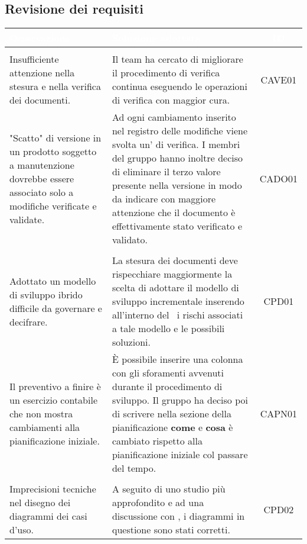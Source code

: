 \subsection{Revisione dei requisiti}
	\begin{longtable}{|C{4cm}|C{9cm}|c|}
		\textcolor{white}{\textbf{Osservazione}}&
		\textcolor{white}{\textbf{Soluzione adottata}}&
		\textcolor{white}{\textbf{ID}}\label{tab:CriticitàRR}\\ \hline
		\\ \hline
		Insufficiente attenzione nella stesura e nella verifica dei documenti. & Il team ha cercato di migliorare il procedimento di verifica continua eseguendo le operazioni di verifica con maggior cura. & CAVE01\\ \hline %
		"Scatto" di versione in un prodotto soggetto a manutenzione dovrebbe essere associato solo a modifiche verificate e validate. & Ad ogni cambiamento inserito nel registro delle modifiche viene svolta un' di verifica. I membri del gruppo hanno inoltre deciso di eliminare il terzo valore presente nella versione in modo da indicare con maggiore attenzione che il documento è effettivamente stato verificato e validato. & CADO01\\ \hline %
		\\ \hline
		Adottato un modello di sviluppo ibrido difficile da governare e decifrare. & La stesura dei documenti deve rispecchiare maggiormente la scelta di adottare il modello di sviluppo incrementale inserendo all'interno del \PdP\ i rischi associati a tale modello e le possibili soluzioni. & CPD01\\ \hline %
		Il preventivo a finire è un esercizio contabile che non mostra cambiamenti alla pianificazione iniziale. & È possibile inserire una colonna con gli sforamenti avvenuti durante il procedimento di sviluppo. Il gruppo ha deciso poi di scrivere nella sezione della pianificazione \textbf{come} e \textbf{cosa} è cambiato rispetto alla pianificazione iniziale col passare del tempo. & CAPN01\\ \hline \newpage %
		\\ \hline
		Imprecisioni tecniche nel disegno dei diagrammi dei casi d’uso. & A seguito di uno studio più approfondito e ad una discussione con \CR{}, i diagrammi in questione sono stati corretti. & CPD02\\ \hline %

\end{longtable}
